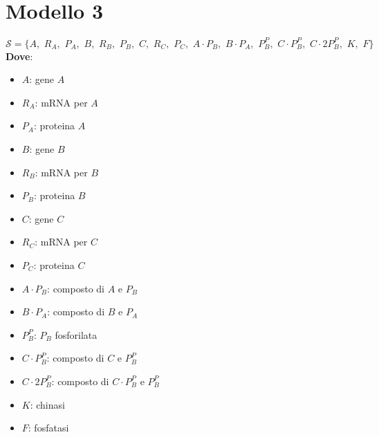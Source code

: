 \documentclass{article}
\begin{document}
\section*{Modello 3}
\[\mathcal{S}=\{A,\,\, R_A,\,\, P_A,\,\, B,\,\, R_B,\,\, P_B,\,\,C,\,\, R_C,\,\,
  P_C,\,\, A\cdot P_B,\,\, B\cdot P_A,\,\, P_B^P,\,\, C\cdot P_B^P,\,\,  C\cdot 
  2P_B^P,\,\,  K,\,\, F\}\]    
\textbf{Dove}:
\begin{multicols}{2}
  \begin{itemize}
    \item $A$: gene $A$
    \item $R_A$: mRNA per $A$
    \item $P_A$: proteina $A$
    \item $B$: gene $B$
    \item $R_B$: mRNA per $B$
    \item $P_B$: proteina $B$
    \item $C$: gene $C$
    \item $R_C$: mRNA per $C$
    \item $P_C$: proteina $C$
    \item $A\cdot P_B$: composto di $A$ e $P_B$
    \item $B\cdot P_A$: composto di $B$ e $P_A$
    \item $P_B^P$: $P_B$ fosforilata
    \item $C\cdot P_B^P$: composto di $C$ e $P_B^P$
    \item $C\cdot 2P_B^P$: composto di $C\cdot P_B^P$ e $P_B^P$
    \item $K$: chinasi
    \item $F$: fosfatasi
  \end{itemize}
\end{multicols}
\end{document}
